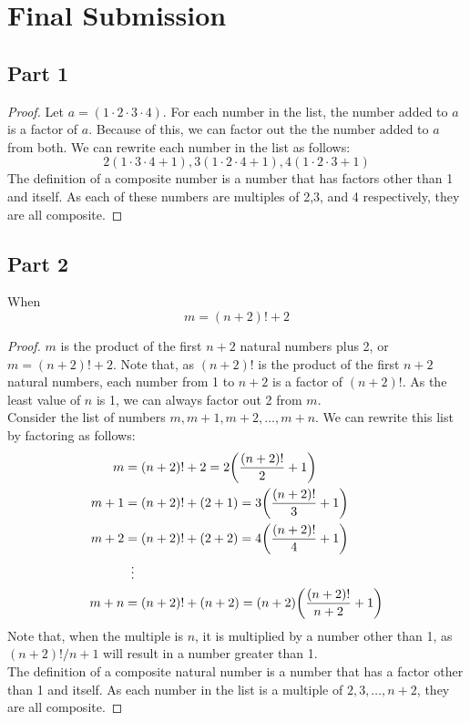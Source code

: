 \documentclass[article, 12pt]{article}
\theoremstyle{definition}
\DeclarePairedDelimiter\paren{(}{)} %
\begin{document}
    \section*{Final Submission}
    \subsection*{Part 1}
    \begin{proof}
        Let $a = (1 \cdot 2 \cdot 3 \cdot 4)$. For each number in the list, the number added to $a$ is a factor of $a$. Because of this, we can factor out the the number added to $a$ from both. We can rewrite each number in the list as follows:
        \[ 2(1 \cdot 3 \cdot 4 + 1), 3(1 \cdot 2 \cdot 4 + 1), 4(1 \cdot 2 \cdot 3 + 1) \]
        The definition of a composite number is a number that has factors other than 1 and itself. As each of these numbers are multiples of 2,3, and 4 respectively, they are all composite.
    \end{proof}
    \subsection*{Part 2}
    When 
    \[ m = (n+2)! + 2 \]

    \begin{proof}
        $m$ is the product of the first $n+2$ natural numbers plus 2, or $m = (n+2)! + 2$. Note that, as $(n+2)!$ is the product of the first $n+2$ natural numbers, each number from 1 to $n+2$ is a factor of $(n+2)!$. As the least value of $n$ is 1, we can always factor out 2 from $m$.
        \\[12pt]
        Consider the list of numbers $m, m+1, m+2, \dots, m+n$. We can rewrite this list by factoring as follows:
        \begin{align*}
            m &= (n+2)! + 2 = 2\paren*{\frac{(n+2)!}{2} + 1} \\
            m+1 &= (n+2)! + (2+1) = 3\paren*{\frac{(n+2)!}{3} + 1} \\
            m+2 &= (n+2)! + (2+2) = 4\paren*{\frac{(n+2)!}{4} + 1} \\
            &\vdotswithin{=} \\
            m+n &= (n+2)! + (n+2) = (n+2)\paren*{\frac{(n+2)!}{n+2} + 1}
        \end{align*}
        Note that, when the multiple is $n$, it is multiplied by a number other than 1, as $(n+2)!/n + 1$ will result in a number greater than 1. 
        \\[12pt]
        The definition of a composite natural number is a number that has a factor other than 1 and itself. As each number in the list is a multiple of $2,3,\dots, n+2$, they are all composite. 
    \end{proof}
\end{document}
